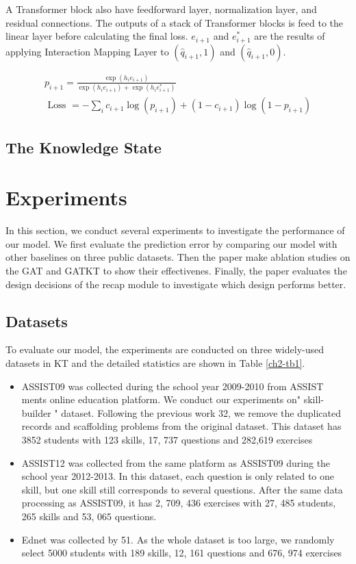 A Transformer block also have feedforward layer, normalization layer, and residual connections. The outputs of a stack of Transformer blocks is feed to the linear layer before calculating the final loss. $e_{i+1}$ and $e_{i+1}^*$ are the results of applying Interaction Mapping Layer to $(\hat{q}_{i+1}, 1)$ and $(\hat{q}_{i+1}, 0)$.

$$
\begin{array}{c}
p_{i+1}=\frac{\exp \left(h_{i} e_{i+1}\right)}{\exp \left(h_{i} e_{i+1}\right)+\exp \left(h_{i} e_{i+1}^{*}\right)} \\
\text { Loss }=-\sum_{i} c_{i+1} \log \left(p_{i+1}\right)+\left(1-c_{i+1}\right) \log \left(1-p_{i+1}\right)
\end{array}
$$

\subsection{The Knowledge State }

\section{Experiments}
In this section, we conduct several experiments to investigate the performance of our model. We first evaluate the prediction error by comparing our model with other baselines on three public datasets. Then the paper make ablation studies on the GAT and GATKT to show their effectivenes. Finally, the paper evaluates the design decisions of the recap module to investigate which design performs better.
\subsection{Datasets}
To evaluate our model, the experiments are conducted on three widely-used datasets in KT and the detailed statistics are shown in Table \ref{ch2-tb1}.
\begin{itemize}
  \item ASSIST09 was collected during the school year 2009-2010 from ASSIST ments online education platform. We conduct our experiments on" skill- builder " dataset. Following the previous work 32, we remove the duplicated records and scaffolding problems from the original dataset. This dataset has 3852 students with 123 skills, 17, 737 questions and 282,619 exercises
  \item ASSIST12 was collected from the same platform as ASSIST09 during the school year 2012-2013. In this dataset, each question is only related to one skill, but one skill still corresponds to several questions. After the same data processing as ASSIST09, it has 2, 709, 436 exercises with 27, 485 students, 265 skills and 53, 065 questions.
  \item Ednet was collected by 51. As the whole dataset is too large, we randomly select 5000 students with 189 skills, 12, 161 questions and 676, 974 exercises
\end{itemize}
 
